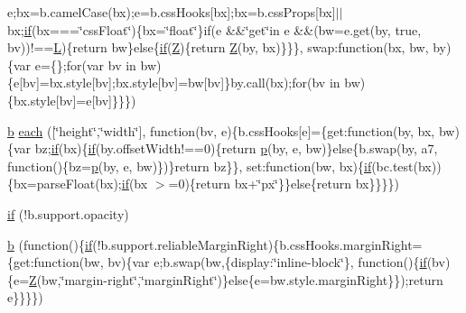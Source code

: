 \begin{DoxyCompactItemize}
e;bx=b.\+camel\+Case(bx);e=b.\+css\+Hooks\mbox{[}bx\mbox{]};bx=b.\+css\+Props\mbox{[}bx\mbox{]}$\vert$$\vert$bx;\hyperlink{html_2jquery_8js_a42cbfadee2b4749e8f699ea8d745a0e4}{if}(bx===\char`\"{}css\+Float\char`\"{})\{bx=\char`\"{}float\char`\"{}\}if(e \&\&\char`\"{}get\char`\"{}in e \&\&(bw=e.\+get(by, true, bv))!==\hyperlink{html_2jquery_8js_a38ee4c0b5f4fe2a18d0c783af540d253}{L})\{return bw\}else\{\hyperlink{html_2jquery_8js_a42cbfadee2b4749e8f699ea8d745a0e4}{if}(\hyperlink{html_2jquery_8js_adc18d83abfd9f87d396e8fd6b6ac0fe1}{Z})\{return \hyperlink{html_2jquery_8js_adc18d83abfd9f87d396e8fd6b6ac0fe1}{Z}(by, bx)\}\}\}, swap\+:function(bx, bw, by)\{var e=\{\};for(var bv in bw)\{e\mbox{[}bv\mbox{]}=bx.\+style\mbox{[}bv\mbox{]};bx.\+style\mbox{[}bv\mbox{]}=bw\mbox{[}bv\mbox{]}\}by.\+call(bx);for(bv in bw)\{bx.\+style\mbox{[}bv\mbox{]}=e\mbox{[}bv\mbox{]}\}\}\})
\item 
\hyperlink{html_2jquery_8js_a2fa551895933fae935a0a6b87282241d}{b} \hyperlink{docs_2_programmer's_manual_2html_2jquery_8js_a871ff39db627c54c710a3e9909b8234c}{each} (\mbox{[}\char`\"{}height\char`\"{},\char`\"{}width\char`\"{}\mbox{]}, function(bv, e)\{b.\+css\+Hooks\mbox{[}e\mbox{]}=\{get\+:function(by, bx, bw)\{var bz;\hyperlink{html_2jquery_8js_a42cbfadee2b4749e8f699ea8d745a0e4}{if}(bx)\{\hyperlink{html_2jquery_8js_a42cbfadee2b4749e8f699ea8d745a0e4}{if}(by.\+offset\+Width!==0)\{return \hyperlink{html_2jquery_8js_a2335e57f79b6acfb6de59c235dc8a83e}{p}(by, e, bw)\}else\{b.\+swap(by, a7, function()\{bz=\hyperlink{html_2jquery_8js_a2335e57f79b6acfb6de59c235dc8a83e}{p}(by, e, bw)\})\}return bz\}\}, set\+:function(bw, bx)\{\hyperlink{html_2jquery_8js_a42cbfadee2b4749e8f699ea8d745a0e4}{if}(bc.\+test(bx))\{bx=parse\+Float(bx);\hyperlink{html_2jquery_8js_a42cbfadee2b4749e8f699ea8d745a0e4}{if}(bx $>$=0)\{return bx+\char`\"{}px\char`\"{}\}\}else\{return bx\}\}\}\})
\item 
\hyperlink{docs_2_programmer's_manual_2html_2jquery_8js_a9db6d45a025ad692282fe23e69eeba43}{if} (!b.\+support.\+opacity)
\item 
\hyperlink{docs_2_programmer's_manual_2html_2jquery_8js_a2fa551895933fae935a0a6b87282241d}{b} (function()\{\hyperlink{html_2jquery_8js_a42cbfadee2b4749e8f699ea8d745a0e4}{if}(!b.\+support.\+reliable\+Margin\+Right)\{b.\+css\+Hooks.\+margin\+Right=\{get\+:function(bw, bv)\{var e;b.\+swap(bw,\{display\+:\char`\"{}inline-\/block\char`\"{}\}, function()\{\hyperlink{html_2jquery_8js_a42cbfadee2b4749e8f699ea8d745a0e4}{if}(bv)\{e=\hyperlink{html_2jquery_8js_adc18d83abfd9f87d396e8fd6b6ac0fe1}{Z}(bw,\char`\"{}margin-\/right\char`\"{},\char`\"{}margin\+Right\char`\"{})\}else\{e=bw.\+style.\+margin\+Right\}\});return e\}\}\}\})

\end{DoxyCompactItemize}
